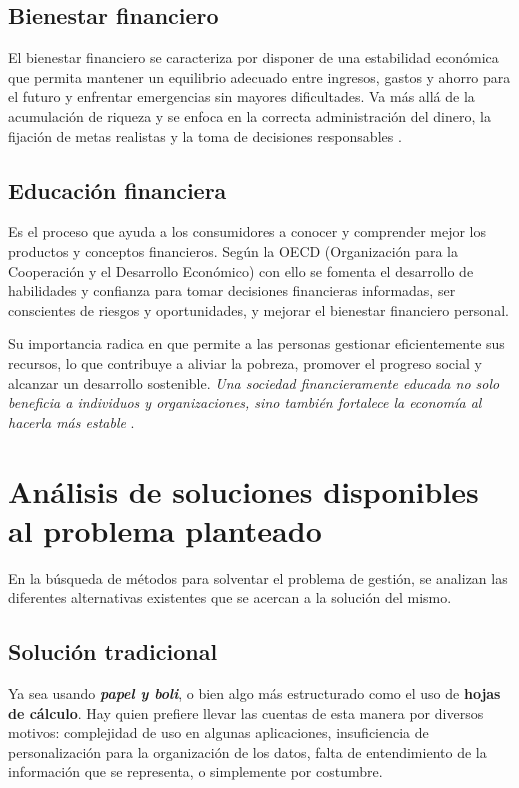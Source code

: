 \subsection*{Bienestar financiero}
El bienestar financiero se caracteriza por disponer de una estabilidad económica que 
permita mantener un equilibrio adecuado entre ingresos, gastos y ahorro para el futuro 
y enfrentar emergencias sin mayores dificultades. Va más allá de la acumulación de 
riqueza y se enfoca en la correcta administración del dinero, la fijación de metas 
realistas y la toma de decisiones responsables \cite{tesis-cultura-financiera}.

\subsection*{Educación financiera}
Es el proceso que ayuda a los consumidores a conocer y 
comprender mejor los productos y conceptos financieros. Según la OECD (Organización para la Cooperación y el Desarrollo Económico) con ello se fomenta el 
desarrollo de habilidades y confianza para tomar decisiones financieras informadas, ser conscientes de riesgos y oportunidades, y mejorar el bienestar financiero personal.

Su importancia radica en que permite a las personas gestionar eficientemente sus recursos, lo que contribuye a aliviar la pobreza, promover el progreso social y alcanzar un desarrollo sostenible. \textit{Una sociedad financieramente educada no solo beneficia a individuos y organizaciones, sino también fortalece la economía al hacerla más estable} \cite{capituloIX}\cite{ariza2024educacion}\cite{sarango2023educacion}.

\section{Análisis de soluciones disponibles al problema planteado}

En la búsqueda de métodos para solventar el problema de gestión, se analizan las diferentes alternativas existentes que se acercan a la solución del mismo.

\subsection{Solución tradicional}
Ya sea usando \textit{\textbf{papel y boli}}, o bien algo más 
estructurado como el uso de \textbf{hojas de cálculo}. Hay quien prefiere llevar las 
cuentas de esta manera por diversos motivos: complejidad de uso en algunas aplicaciones, 
insuficiencia de personalización para la organización de los datos, falta de entendimiento 
de la información que se representa, o simplemente por costumbre.

